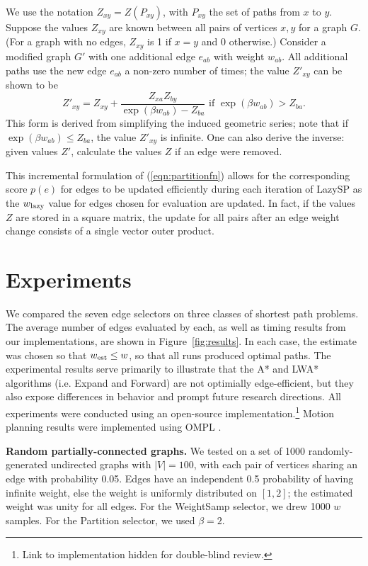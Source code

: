 We use the notation $Z_{xy} = Z(P_{xy})$,
with $P_{xy}$ the set of paths from $x$ to $y$.
Suppose the values $Z_{xy}$ are known between
all pairs of vertices $x, y$ for a graph $G$.
(For a graph with no edges,
$Z_{xy}$ is 1 if $x = y$ and 0 otherwise.)
Consider a modified graph $G'$ with one additional edge $e_{ab}$
with weight $w_{ab}$.
All additional paths use the new edge $e_{ab}$ a non-zero
number of times;
the value $Z'_{xy}$ can be shown to be
\begin{equation}
   Z'_{xy} = Z_{xy} + \frac{Z_{xa} Z_{by}}{\exp(\beta w_{ab}) - Z_{ba}}
   \mbox{ if }
   \exp(\beta w_{ab}) > Z_{ba}.
\end{equation}
This form is derived from simplifying the induced geometric series;
note that if $\exp(\beta w_{ab})  \leq Z_{ba}$,
the value $Z'_{xy}$ is infinite.
One can also derive the inverse:
given values $Z'$,
calculate the values $Z$ if an edge were removed.

This incremental formulation of (\ref{eqn:partitionfn})
allows for the corresponding score $p(e)$ for edges
to be updated efficiently during each iteration of LazySP as
the $w_{\mbox{\scriptsize lazy}}$ value for edges chosen for evaluation are updated.
In fact,
if the values $Z$ are stored in a square matrix,
the update for all pairs after an edge weight change consists of a single
vector outer product.

\section{Experiments}

We compared the seven edge selectors on three classes of shortest path
problems.
The average number of edges evaluated by each,
as well as timing results from our implementations,
are shown in Figure~\ref{fig:results}.
In each case,
the estimate was chosen so that $w_{\mbox{\scriptsize est}} \leq w$,
so that all runs produced optimal paths.
The experimental results serve primarily to illustrate that
the A* and LWA* algorithms
(i.e. Expand and Forward)
are not optimially edge-efficient,
but they also expose differences in behavior and prompt
future research directions.
All experiments were conducted using an open-source
implementation.\footnote{%
Link to implementation hidden for double-blind review.
}
Motion planning results were implemented using
OMPL \citep{sucan2012ompl}.

\textbf{Random partially-connected graphs.}
We tested on a set of 1000 randomly-generated undirected graphs
with $|V|=100$,
with each pair of vertices sharing an edge with probability 0.05.
Edges have an independent 0.5 probability of having infinite weight,
else the weight is uniformly distributed on $[1,2]$;
the estimated weight was unity for all edges.
For the WeightSamp selector,
we drew 1000 $w$ samples.
For the Partition selector, we used $\beta = 2$.

